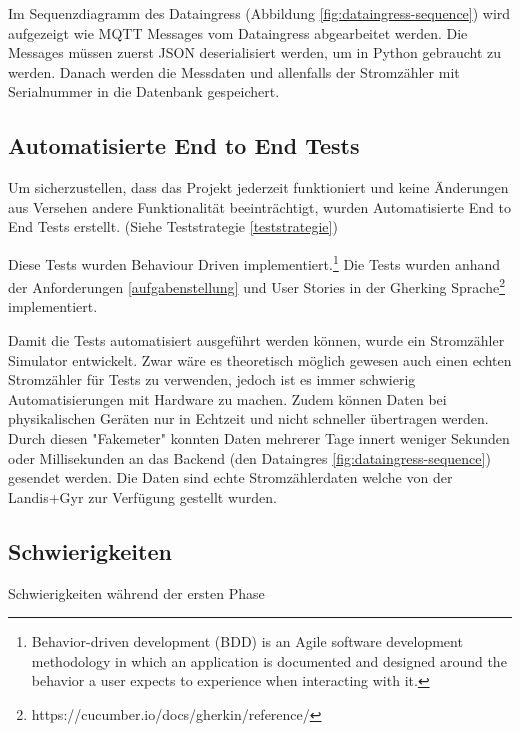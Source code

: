 Im Sequenzdiagramm des Dataingress (Abbildung \ref{fig:dataingress-sequence}) wird aufgezeigt
wie \ac{MQTT} Messages vom Dataingress abgearbeitet werden.
Die Messages müssen zuerst \ac{JSON} deserialisiert werden, um in Python
gebraucht zu werden. Danach werden die Messdaten und allenfalls der
Stromzähler mit Serialnummer in die Datenbank gespeichert.

\subsection{Automatisierte End to End Tests}

Um sicherzustellen, dass das Projekt jederzeit funktioniert und keine Änderungen
aus Versehen andere Funktionalität beeinträchtigt, wurden Automatisierte
End to End Tests erstellt. (Siehe Teststrategie \ref{teststrategie})

Diese Tests wurden Behaviour Driven implementiert.\footnote{
    Behavior-driven development (BDD) is an Agile software development methodology
    in which an application is documented and designed around the behavior a user
    expects to experience when interacting with it.
}\parencite{what_is_bdd} Die Tests wurden anhand der Anforderungen \ref{aufgabenstellung}
und User Stories in der Gherking Sprache\footnote{https://cucumber.io/docs/gherkin/reference/} implementiert.

Damit die Tests automatisiert ausgeführt werden können, wurde ein Stromzähler Simulator entwickelt.
Zwar wäre es theoretisch möglich gewesen auch einen echten Stromzähler für Tests zu verwenden,
jedoch ist es immer schwierig Automatisierungen mit Hardware zu machen. Zudem können
Daten bei physikalischen Geräten nur in Echtzeit und nicht schneller übertragen werden.
Durch diesen "Fakemeter" konnten Daten mehrerer Tage innert weniger Sekunden oder Millisekunden
an das Backend (den Dataingres \ref{fig:dataingress-sequence}) gesendet werden.
Die Daten sind echte Stromzählerdaten welche von der Landis+Gyr zur Verfügung
gestellt wurden.

\subsection{Schwierigkeiten}
Schwierigkeiten während der ersten Phase